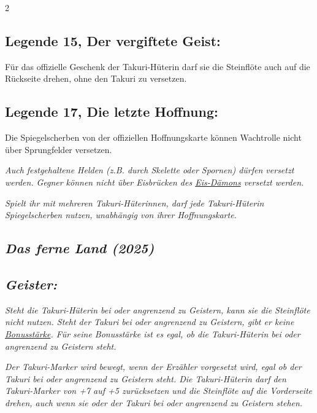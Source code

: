 \documentclass[10pt, a4paper, oneside]{book}
\newcommand{\fan}[1]{\textit{#1}}
\begin{document}
\begin{multicols*}{2}
\begin{bgcolor}
\subsection{Legende 15, Der vergiftete Geist:}

Für das offizielle Geschenk der Takuri-Hüterin darf sie die Steinflöte auch auf die Rückseite drehen, ohne den Takuri zu versetzen.
\supercite{mh-begleitheft}


\subsection{Legende 17, Die letzte Hoffnung:}

Die Spiegelscherben von der offiziellen Hoffnungskarte können Wachtrolle nicht über Sprungfelder versetzen. 
\supercite{mh-begleitheft}

\fan{Auch festgehaltene Helden (z.B. durch Skelette oder Spornen) dürfen versetzt werden.}
\fan{Gegner können nicht über Eisbrücken des \hyperref[eis-daemon]{Eis-Dämons} versetzt werden.}

\fan{Spielt ihr mit mehreren Takuri-Hüterinnen, darf jede Takuri-Hüterin Spiegelscherben nutzen, unabhängig von ihrer Hoffnungskarte.}

\end{bgcolor}


\columnbreak



\begin{bgcolor}
\section{\fan{Das ferne Land (2025)}}



\subsection{\fan{Geister:}}

\fan{Steht die Takuri-Hüterin bei oder angrenzend zu Geistern, kann sie die Steinflöte nicht nutzen. Steht der Takuri bei oder angrenzend zu Geistern, gibt er keine \hyperref[bonusstaerke]{Bonusstärke}. Für seine Bonusstärke ist es egal, ob die Takuri-Hüterin bei oder angrenzend zu Geistern steht.}

\fan{Der Takuri-Marker wird bewegt, wenn der Erzähler vorgesetzt wird, egal ob der Takuri bei oder angrenzend zu Geistern steht. Die Takuri-Hüterin darf den Takuri-Marker von +7 auf +5 zurücksetzen und die Steinflöte auf die Vorderseite drehen, auch wenn sie oder der Takuri bei oder angrenzend zu Geistern stehen.}

\end{bgcolor}


\end{multicols*}
\end{document}
